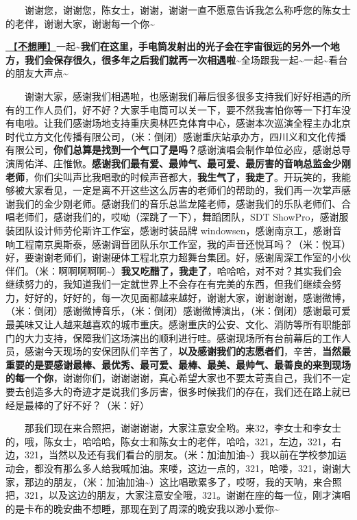 \documentclass[]{ctexbook}
\begin{document}
  谢谢您，谢谢您，陈女士，谢谢，谢谢一直不愿意告诉我怎么称呼您的陈女士的老伴，谢谢大家，谢谢每一个你\textasciitilde{}

\hyperref[keep-playing]{🎵【\textbf{不想睡}】}一起\textasciitilde{}\textbf{我们在这里，手电筒发射出的光子会在宇宙很远的另外一个地方，我们会保存很久，很多年之后我们就再一次相遇啦\textasciitilde{}}全场跟我一起\textasciitilde 一起\textasciitilde 看台的朋友大声点\textasciitilde{}

  谢谢大家，感谢我们相遇啦，也感谢我们幕后很多很多支持我们好好相遇的所有的工作人员们，好不好？大家手电筒可以关一下，要不然我害怕你等一下打车没有电啦。让我们感谢场地支持重庆奥林匹克体育中心，感谢本次巡演全程主办北京时代立方文化传播有限公司，（米：倒闭）感谢重庆站承办方，四川义和文化传播有限公司，\textbf{你们总算是找到一个气口了是吗？}感谢演唱会制作单位必应，感谢总导演周佑洋、庄惟惞。\textbf{感谢我们最有爱、最帅气、最可爱、最厉害的音响总监金少刚老师}，你们尖叫声比我唱歌的时候声音都大，\textbf{我生气了，我走了}。开玩笑的，我能够被大家看见，一定是离不开这些这么厉害的老师们的帮助的，我们再一次掌声感谢我们的金少刚老师。感谢我们的音乐总监龙隆老师，感谢我们的乐队老师们、合唱老师们，感谢我们的，哎呦（深跳了一下），舞蹈团队，SDT ShowPro，感谢服装团队设计师劳伦斯许工作室，感谢时装品牌 windowsen，感谢南京工，感谢音响工程南京奥斯泰，感谢调音团队乐尔工作室，我的声音还悦耳吗？（米：悦耳）好，要谢谢老师们，谢谢硬体工程北京力超舞台集团。好，感谢周深工作室的小伙伴们。（米：啊啊啊啊啊\textasciitilde）\textbf{我又吃醋了，我走了}，哈哈哈，对不对？其实我们会继续努力的，我知道我们一定就世界上不会存在有完美的东西，但我们继续会努力，好好的，好好的，每一次见面都越来越好，谢谢大家，谢谢谢谢，感谢微博，（米：倒闭）感谢微博音乐，（米：倒闭）感谢微博演出，（米：倒闭）感谢最可爱最美味又让人越来越喜欢的城市重庆。感谢重庆的公安、文化、消防等所有职能部门的大力支持，保障我们这场演出的顺利进行哇。感谢现场所有台前幕后的工作人员，感谢今天现场的安保团队们辛苦了，\textbf{以及感谢我们的志愿者们}，辛苦，\textbf{当然最重要的是要感谢最棒、最优秀、最可爱、最棒、最美、最帅气、最善良的来到现场的每一个你}，谢谢你们，谢谢谢谢，真心希望大家也不要太苛责自己，我们不一定要去创造多大的奇迹才是说我们多厉害，很多时候我们的存在，我们还在路上就已经是最棒的了好不好？（米：好）

  那我们现在来合照把，谢谢谢谢，大家注意安全哟。来32，李女士和李女士的，哦，陈女士，哈哈哈，陈女士和陈女士的老伴，哈哈，321，左边，321，右边，321，当然以及还有我们看台的朋友。（米：加油加油\textasciitilde）我以前在学校参加运动会，都没有那么多人给我喊加油。来喽，这边一点的，321，哈喽，321，谢谢大家，那边的朋友，（米：加油加油\textasciitilde）这比唱歌累多了，哎呀，我的天呐，来合照把，321，以及这边的朋友，大家注意安全哦，321。谢谢在座的每一位，刚才演唱的是卡布的晚安曲不想睡，那现在到了周深的晚安我以渺小爱你\textasciitilde{}
\end{document}
